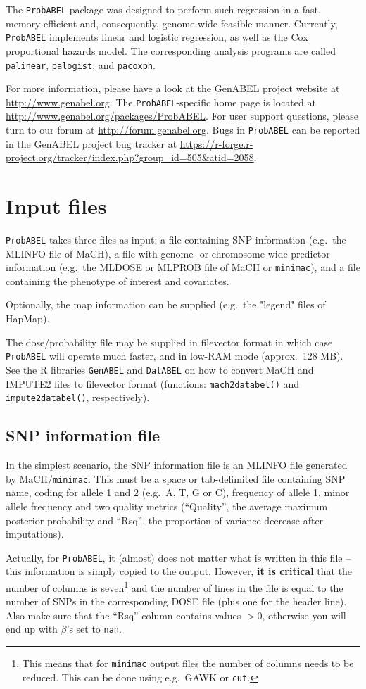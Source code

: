 \documentclass[12pt,a4paper]{article}
\newcommand{\PA}{\texttt{ProbABEL}}
\newcommand{\GA}{\texttt{GenABEL}}
\newcommand{\DA}{\texttt{DatABEL}}
\begin{document}
The \PA{} package was designed to perform such regression
in a fast, memory-efficient and, consequently, genome-wide feasible manner.
Currently, \PA{} implements linear and logistic regression,
as well as the Cox proportional hazards model. The corresponding analysis
programs are called \texttt{palinear},  \texttt{palogist},
and \texttt{pacoxph}.

For more information, please have a look at the GenABEL project
website at \url{http://www.genabel.org}. The \PA{}-specific home
page is located at
\url{http://www.genabel.org/packages/ProbABEL}. For user support
questions, please turn to our forum at
\url{http://forum.genabel.org}. Bugs in \PA{} can be reported in the
GenABEL project bug tracker at
\url{https://r-forge.r-project.org/tracker/index.php?group_id=505&atid=2058}.

\section{Input files}
\PA{} takes three files as input: a file containing SNP
information (e.g.~the MLINFO file of MaCH), a file with genome- or
chromosome-wide predictor information (e.g.~the MLDOSE or MLPROB file
of MaCH or \texttt{minimac}),
and a file containing the phenotype of interest and covariates.

Optionally, the map information can be supplied (e.g.~the "legend"
files of HapMap).

The dose/probability file may be supplied in filevector format
in which case \PA{} will operate much faster, and
in low-RAM mode (approx.~128 MB). See the R libraries \GA{} and
\DA{} on how to convert MaCH and IMPUTE2 files to
filevector format (functions: \texttt{mach2databel()} and
\texttt{impute2databel()}, respectively).

\subsection{SNP information file}
\label{ssec:infoin}
In the simplest scenario, the SNP information file is an MLINFO
file generated by MaCH/\texttt{minimac}. This must be a space or tab-delimited file
containing SNP name, coding for allele 1 and 2 (e.g.~A, T, G or C),
frequency of allele 1, minor allele frequency and two quality
metrics (``Quality'', the average maximum posterior probability and
``Rsq'', the proportion of variance decrease after imputations).

Actually, for \PA{}, it (almost) does not matter what is written in
this file -- this information is simply copied to the output. However,
\textbf{it is critical} that the number of columns is
seven\footnote{This means that for \texttt{minimac} output files the number of
  columns needs to be reduced. This can be done using e.g.~GAWK or
  \texttt{cut}.} and the number of lines in the file is equal to the
number of SNPs in the corresponding DOSE file (plus one for the header
line). Also make sure that the ``Rsq'' column contains values $>0$,
otherwise you will end up with $\beta$'s set to \texttt{nan}.
\end{document}
